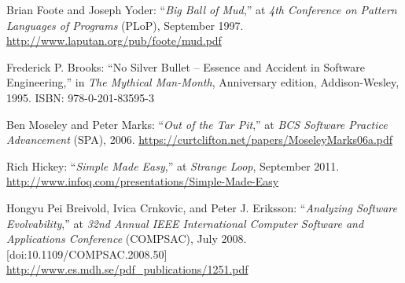 \begin{thebibliography}{99}
   Brian Foote and Joseph Yoder: ``\textit{Big Ball of Mud},'' at \textit{4th Conference on Pattern Languages of Programs} (PLoP), September 1997. \url{http://www.laputan.org/pub/foote/mud.pdf}

   Frederick P. Brooks: ``No Silver Bullet – Essence and Accident in Software Engineering,'' in \textit{The Mythical Man-Month}, Anniversary edition, Addison-Wesley, 1995. ISBN: 978-0-201-83595-3

   Ben Moseley and Peter Marks: ``\textit{Out of the Tar Pit},'' at \textit{BCS Software Practice Advancement} (SPA), 2006. \url{https://curtclifton.net/papers/MoseleyMarks06a.pdf}

   Rich Hickey: ``\textit{Simple Made Easy},'' at \textit{Strange Loop}, September 2011. \url{http://www.infoq.com/presentations/Simple-Made-Easy}

   Hongyu Pei Breivold, Ivica Crnkovic, and Peter J. Eriksson: ``\textit{Analyzing Software Evolvability},'' at \textit{32nd Annual IEEE International Computer Software and Applications Conference} (COMPSAC), July 2008. [doi:10.1109/COMPSAC.2008.50] \url{http://www.es.mdh.se/pdf_publications/1251.pdf}

\end{thebibliography}